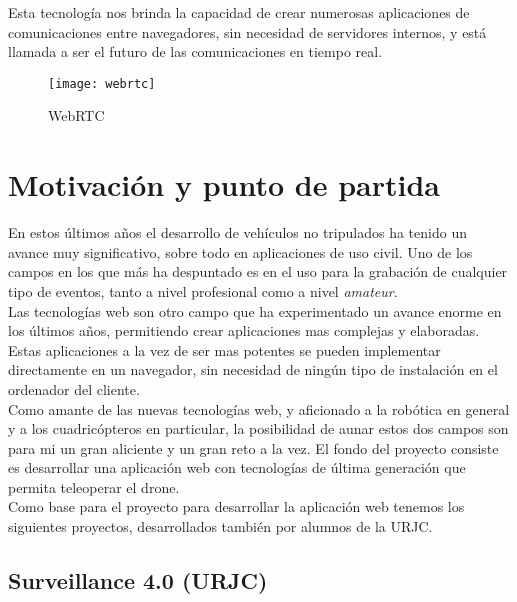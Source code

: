 Esta tecnología nos brinda la capacidad de crear numerosas aplicaciones de comunicaciones entre navegadores, sin necesidad de servidores internos, y está llamada a ser el futuro de las comunicaciones en tiempo real.\\

\begin{figure}[htb]
\centering
\texttt{[image: webrtc]}
\caption{WebRTC}
\label{fig:webrtc}
\end{figure}



\section{Motivación y punto de partida}

En estos últimos años el desarrollo de vehículos no tripulados ha tenido un avance muy significativo, sobre todo en aplicaciones de uso civil. Uno de los campos en los que más ha despuntado es en el uso para la grabación de cualquier tipo de eventos, tanto a nivel profesional como a nivel \emph{amateur}.\\

Las tecnologías web son otro campo que ha experimentado un avance enorme en los últimos años, permitiendo crear aplicaciones mas complejas y elaboradas. Estas aplicaciones a la vez de ser mas potentes se pueden implementar directamente en un navegador, sin necesidad de ningún tipo de instalación en el ordenador del cliente.\\

Como amante de las nuevas tecnologías web, y aficionado a la robótica en general y a los cuadricópteros en particular, la posibilidad de aunar estos dos campos son para mi un gran aliciente y un gran reto a la vez. El fondo del proyecto consiste es desarrollar una aplicación web con tecnologías de última generación que permita teleoperar el drone.\\

Como base para el proyecto para desarrollar la aplicación web tenemos los siguientes proyectos, desarrollados también por alumnos de la URJC.\\

\subsection{Surveillance 4.0 (URJC)}


